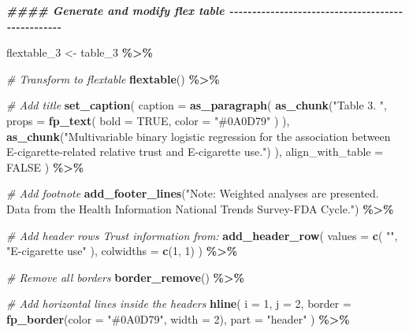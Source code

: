 \documentclass[
]{article}
\newenvironment{Shaded}{\begin{snugshade}}{\end{snugshade}}
\newcommand{\AttributeTok}[1]{\textcolor[rgb]{0.13,0.29,0.53}{#1}}
\newcommand{\CommentTok}[1]{\textcolor[rgb]{0.56,0.35,0.01}{\textit{#1}}}
\newcommand{\ConstantTok}[1]{\textcolor[rgb]{0.56,0.35,0.01}{#1}}
\newcommand{\DecValTok}[1]{\textcolor[rgb]{0.00,0.00,0.81}{#1}}
\newcommand{\DocumentationTok}[1]{\textcolor[rgb]{0.56,0.35,0.01}{\textbf{\textit{#1}}}}
\newcommand{\FunctionTok}[1]{\textcolor[rgb]{0.13,0.29,0.53}{\textbf{#1}}}
\newcommand{\NormalTok}[1]{#1}
\newcommand{\OtherTok}[1]{\textcolor[rgb]{0.56,0.35,0.01}{#1}}
\newcommand{\SpecialCharTok}[1]{\textcolor[rgb]{0.81,0.36,0.00}{\textbf{#1}}}
\newcommand{\StringTok}[1]{\textcolor[rgb]{0.31,0.60,0.02}{#1}}
\begin{document}
\begin{Shaded}
\begin{Highlighting}[]
\DocumentationTok{\#\#\#\# Generate and modify flex table {-}{-}{-}{-}{-}{-}{-}{-}{-}{-}{-}{-}{-}{-}{-}{-}{-}{-}{-}{-}{-}{-}{-}{-}{-}{-}{-}{-}{-}{-}{-}{-}{-}{-}{-}{-}{-}{-}{-}{-}{-}{-}{-}{-}{-}{-}{-}{-}{-}{-}}


\NormalTok{flextable\_3 }\OtherTok{\textless{}{-}}\NormalTok{ table\_3 }\SpecialCharTok{\%\textgreater{}\%}
  
  \CommentTok{\# Transform to flextable}
  \FunctionTok{flextable}\NormalTok{() }\SpecialCharTok{\%\textgreater{}\%}
  
  \CommentTok{\# Add title}
  \FunctionTok{set\_caption}\NormalTok{(}
    \AttributeTok{caption =} \FunctionTok{as\_paragraph}\NormalTok{(}
      \FunctionTok{as\_chunk}\NormalTok{(}\StringTok{"Table 3. "}\NormalTok{,}
               \AttributeTok{props =} \FunctionTok{fp\_text}\NormalTok{(}
                 \AttributeTok{bold =} \ConstantTok{TRUE}\NormalTok{,}
                 \AttributeTok{color =} \StringTok{"\#0A0D79"}
\NormalTok{                 )}
\NormalTok{               ),}
      \FunctionTok{as\_chunk}\NormalTok{(}\StringTok{"Multivariable binary logistic regression for the association between E{-}cigarette{-}related relative trust and E{-}cigarette use."}\NormalTok{)}
\NormalTok{    ),}
    \AttributeTok{align\_with\_table =} \ConstantTok{FALSE}
\NormalTok{    ) }\SpecialCharTok{\%\textgreater{}\%}
  
  \CommentTok{\# Add footnote}
  \FunctionTok{add\_footer\_lines}\NormalTok{(}\StringTok{"Note: Weighted analyses are presented. Data from the Health Information National Trends Survey{-}FDA Cycle."}\NormalTok{) }\SpecialCharTok{\%\textgreater{}\%}
  
  \CommentTok{\# Add header rows \textquotesingle{}Trust information from:\textquotesingle{}}
  \FunctionTok{add\_header\_row}\NormalTok{(}
    \AttributeTok{values =} \FunctionTok{c}\NormalTok{(}
      \StringTok{""}\NormalTok{,}
      \StringTok{"E{-}cigarette use"}
\NormalTok{    ),}
    \AttributeTok{colwidths =} \FunctionTok{c}\NormalTok{(}\DecValTok{1}\NormalTok{, }\DecValTok{1}\NormalTok{)}
\NormalTok{  ) }\SpecialCharTok{\%\textgreater{}\%}
  
  \CommentTok{\# Remove all borders}
  \FunctionTok{border\_remove}\NormalTok{() }\SpecialCharTok{\%\textgreater{}\%}
  
  \CommentTok{\# Add horizontal lines inside the headers}
  \FunctionTok{hline}\NormalTok{(}
    \AttributeTok{i =} \DecValTok{1}\NormalTok{, }
    \AttributeTok{j =} \DecValTok{2}\NormalTok{, }
    \AttributeTok{border =} \FunctionTok{fp\_border}\NormalTok{(}\AttributeTok{color =} \StringTok{"\#0A0D79"}\NormalTok{, }\AttributeTok{width =} \DecValTok{2}\NormalTok{),}
    \AttributeTok{part =} \StringTok{"header"}
\NormalTok{  ) }\SpecialCharTok{\%\textgreater{}\%}
  

\end{Highlighting}
\end{Shaded}
\end{document}

